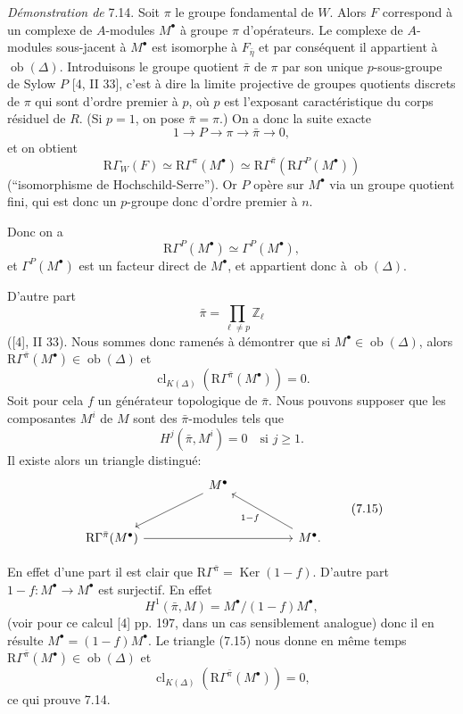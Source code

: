 \documentclass[11pt]{article}
\providecommand{\Ker}{\operatorname{Ker}}
\providecommand{\Ob}{\operatorname{ob}}
\providecommand{\Ker}{\operatorname{Ker}}
\providecommand{\Ker}{\operatorname{Ker}}
\providecommand{\Ob}{\operatorname{ob}}
\providecommand{\Ob}{\operatorname{Ob}}
\providecommand{\clK}[1]{\operatorname{cl}_{K(#1)}}
\providecommand{\Ob}{\operatorname{ob}}
\providecommand{\Ob}{\operatorname{Ob}}
\begin{document}
\emph{Démonstration de} 7.14. Soit $\pi$ le groupe fondamental de $W$. Alors $F$ correspond à un complexe de $A$-modules $M^\bullet$ à groupe $\pi$ d'opérateurs. Le complexe de $A$-modules sous-jacent à $M^\bullet$ est isomorphe à $F_{\bar\eta}$ et par conséquent il appartient à $\Ob(\Delta)$. Introduisons le groupe quotient $\bar\pi$ de $\pi$ par son unique $p$-sous-groupe de Sylow $P$ [4, II 33], c'est à dire la limite projective de groupes quotients discrets de $\pi$ qui sont d'ordre premier à $p$, où $p$ est l'exposant caractéristique du corps résiduel de $R$. (Si $p=1$, on pose $\bar\pi=\pi$.) On a donc la suite exacte
\[
1\longrightarrow P\longrightarrow \pi\longrightarrow \bar\pi\longrightarrow0,
\]
et on obtient
\[
\mathrm{R}\Gamma_W(F)\simeq \mathrm{R}\Gamma^\pi(M^\bullet)
\simeq \mathrm{R}\Gamma^{\bar\pi}(\mathrm{R}\Gamma^P(M^\bullet))
\]
(``isomorphisme de Hochschild-Serre''). Or $P$ opère sur $M^\bullet$ via un groupe quotient fini, qui est donc un $p$-groupe donc d'ordre premier à $n$.

Donc on a
\[
\mathrm{R}\Gamma^P(M^\bullet)\simeq \Gamma^P(M^\bullet),
\]
et $\Gamma^P(M^\bullet)$ est un facteur direct de $M^\bullet$, et appartient donc à $\Ob(\Delta)$.

D'autre part
\[
\bar\pi=\prod_{\ell\ne p}\mathbb Z_\ell
\]
([4], II 33). Nous sommes donc ramenés à démontrer que si $M^\bullet\in\Ob(\Delta)$, alors $\mathrm{R}\Gamma^{\bar\pi}(M^\bullet)\in\Ob(\Delta)$ et
\[
\clK{\Delta}(\mathrm{R}\Gamma^{\bar\pi}(M^\bullet))=0.
\]
Soit pour cela $f$ un générateur topologique de $\bar\pi$. Nous pouvons supposer que les composantes $M^i$ de $M$ sont des $\bar\pi$-modules tels que
\[
H^j(\bar\pi,M^i)=0\quad\text{si }j\ge1.
\]
Il existe alors un triangle distingué:
\[
\begin{tikzcd}[column sep=huge,row sep=large]
& M^\bullet \arrow[dl] &\\
\mathrm{R}\Gamma^{\bar\pi}(M^\bullet) \arrow[rr] && M^\bullet \arrow[ul,"1-f"].
\end{tikzcd}
\tag{7.15}
\]

En effet d'une part il est clair que $\mathrm{R}\Gamma^{\bar\pi}=\Ker(1-f)$. D'autre part $1-f:M^\bullet\to M^\bullet$ est surjectif. En effet
\[
H^1(\bar\pi,M)=M^\bullet/(1-f)M^\bullet,
\]
(voir pour ce calcul [4] pp. 197, dans un cas sensiblement analogue) donc il en résulte $M^\bullet=(1-f)M^\bullet$. Le triangle (7.15) nous donne en même temps $\mathrm{R}\Gamma^{\bar\pi}(M^\bullet)\in\Ob(\Delta)$ et
\[
\clK{\Delta}(\mathrm{R}\Gamma^{\bar\pi}(M^\bullet))=0,
\]
ce qui prouve 7.14.
\end{document}
